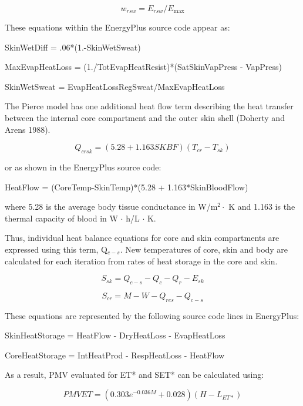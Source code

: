 \begin{equation}
{w_{rsw}} = {E_{rsw}}/{E_{\max }}
\end{equation}

These equations within the EnergyPlus source code appear as:

SkinWetDiff = .06*(1.-SkinWetSweat)

MaxEvapHeatLoss = (1./TotEvapHeatResist)*(SatSkinVapPress - VapPress)

SkinWetSweat = EvapHeatLossRegSweat/MaxEvapHeatLoss

The Pierce model has one additional heat flow term describing the heat transfer between the internal core compartment and the outer skin shell (Doherty and Arens 1988).

\begin{equation}
{Q_{crsk}} = (5.28 + 1.163SKBF)({T_{cr}} - {T_{sk}})
\end{equation}

or as shown in the EnergyPlus source code:

HeatFlow = (CoreTemp-SkinTemp)*(5.28 + 1.163*SkinBloodFlow)

where 5.28 is the average body tissue conductance in W/m\(^2 \cdot \) K and 1.163 is the thermal capacity of blood in W \(\cdot\) h/L \(\cdot\) K.

Thus, individual heat balance equations for core and skin compartments are expressed using this term, Q\(_{c-s}\). New temperatures of core, skin and body are calculated for each iteration from rates of heat storage in the core and skin.

\begin{equation}
{S_{sk}} = {Q_{c - s}} - {Q_c} - {Q_r} - {E_{sk}}
\end{equation}

\begin{equation}
{S_{cr}} = M - W - {Q_{res}} - {Q_{c - s}}
\end{equation}

These equations are represented by the following source code lines in EnergyPlus:

SkinHeatStorage = HeatFlow - DryHeatLoss - EvapHeatLoss

CoreHeatStorage = IntHeatProd - RespHeatLoss - HeatFlow

As a result, PMV evaluated for ET* and SET* can be calculated using:

\begin{equation}
PMVET = (0.303{e^{ - 0.036M}} + 0.028)(H - {L_{ET*}})
\end{equation}

